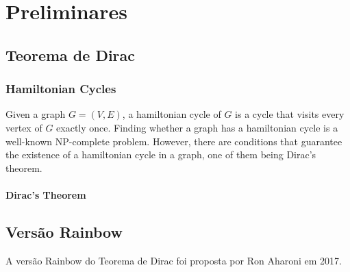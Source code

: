 
\chapter{Preliminares}

\section{Teorema de Dirac}
\subsection{Hamiltonian Cycles}

Given a graph $G = (V, E)$, a hamiltonian cycle of $G$ is a cycle that visits every vertex of $G$ exactly once.
Finding whether a graph has a hamiltonian cycle is a well-known NP-complete problem. 
However, there are conditions that guarantee the existence of a hamiltonian cycle in a graph, one of them being Dirac's theorem.

\subsubsection{Dirac's Theorem}

\section{Versão Rainbow}

A versão Rainbow do Teorema de Dirac foi proposta por Ron Aharoni em 2017. 